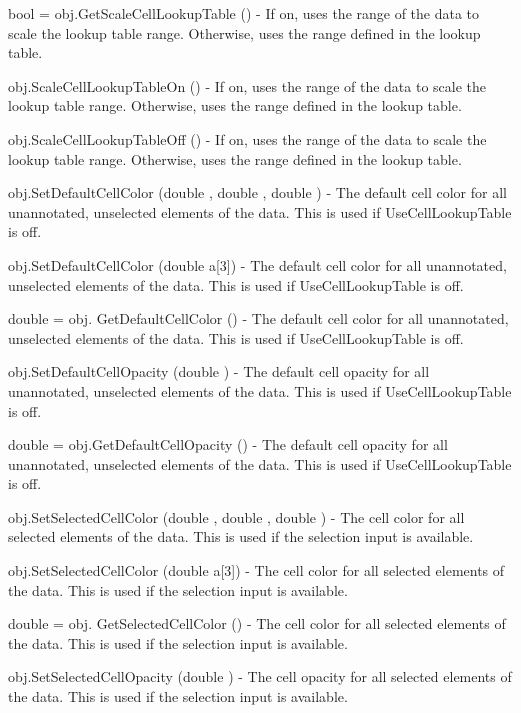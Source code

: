 \begin{DoxyItemize}
\item {\ttfamily bool = obj.\-Get\-Scale\-Cell\-Lookup\-Table ()} -\/ If on, uses the range of the data to scale the lookup table range. Otherwise, uses the range defined in the lookup table.  
\item {\ttfamily obj.\-Scale\-Cell\-Lookup\-Table\-On ()} -\/ If on, uses the range of the data to scale the lookup table range. Otherwise, uses the range defined in the lookup table.  
\item {\ttfamily obj.\-Scale\-Cell\-Lookup\-Table\-Off ()} -\/ If on, uses the range of the data to scale the lookup table range. Otherwise, uses the range defined in the lookup table.  
\item {\ttfamily obj.\-Set\-Default\-Cell\-Color (double , double , double )} -\/ The default cell color for all unannotated, unselected elements of the data. This is used if Use\-Cell\-Lookup\-Table is off.  
\item {\ttfamily obj.\-Set\-Default\-Cell\-Color (double a\mbox{[}3\mbox{]})} -\/ The default cell color for all unannotated, unselected elements of the data. This is used if Use\-Cell\-Lookup\-Table is off.  
\item {\ttfamily double = obj. Get\-Default\-Cell\-Color ()} -\/ The default cell color for all unannotated, unselected elements of the data. This is used if Use\-Cell\-Lookup\-Table is off.  
\item {\ttfamily obj.\-Set\-Default\-Cell\-Opacity (double )} -\/ The default cell opacity for all unannotated, unselected elements of the data. This is used if Use\-Cell\-Lookup\-Table is off.  
\item {\ttfamily double = obj.\-Get\-Default\-Cell\-Opacity ()} -\/ The default cell opacity for all unannotated, unselected elements of the data. This is used if Use\-Cell\-Lookup\-Table is off.  
\item {\ttfamily obj.\-Set\-Selected\-Cell\-Color (double , double , double )} -\/ The cell color for all selected elements of the data. This is used if the selection input is available.  
\item {\ttfamily obj.\-Set\-Selected\-Cell\-Color (double a\mbox{[}3\mbox{]})} -\/ The cell color for all selected elements of the data. This is used if the selection input is available.  
\item {\ttfamily double = obj. Get\-Selected\-Cell\-Color ()} -\/ The cell color for all selected elements of the data. This is used if the selection input is available.  
\item {\ttfamily obj.\-Set\-Selected\-Cell\-Opacity (double )} -\/ The cell opacity for all selected elements of the data. This is used if the selection input is available.  

\end{DoxyItemize}
